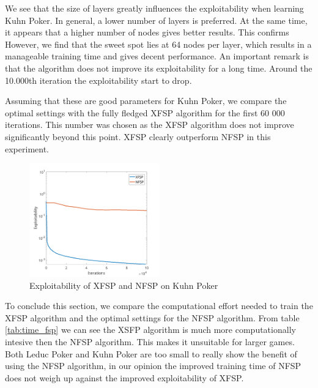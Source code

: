 \documentclass[10pt,a4paper]{article}
\begin{document}
We see that the size of layers greatly influences the exploitability when learning Kuhn Poker. In general, a lower number of layers is preferred. At the same time, it appears that a higher number of nodes gives better results. This confirms However, we find that the sweet spot lies at 64 nodes per layer, which results in a manageable training time and gives decent performance.
An important remark is that the algorithm does not improve its exploitability for a long time. Around the 10.000th iteration the exploitability start to drop. 

Assuming that these are good parameters for Kuhn Poker, we compare the optimal settings with the fully fledged XFSP algorithm for the first 60 000 iterations. This number was chosen as the XFSP algorithm does not improve significantly beyond this point. XFSP clearly outperform NFSP in this experiment.

\begin{figure}[h]
\centering
\label{fig:layers_kuhn}
\includegraphics[width=0.5\textwidth]{Figures/xfsp_nfsp_kuhn.png}
\caption{Exploitability of XFSP and NFSP on Kuhn Poker}
\end{figure}



To conclude this section, we compare the computational effort needed to train the XFSP algorithm and the optimal settings for the NFSP algorithm. From table \ref{tab:time_fsp} we can see the XSFP algorithm is much more computationally intesive then the NFSP algorithm. This makes it unsuitable for larger games. Both Leduc Poker and Kuhn Poker are too small to really show the benefit of using the NFSP algorithm, in our opinion the improved training time of NFSP does not weigh up against the improved exploitability of XFSP.
\end{document}
